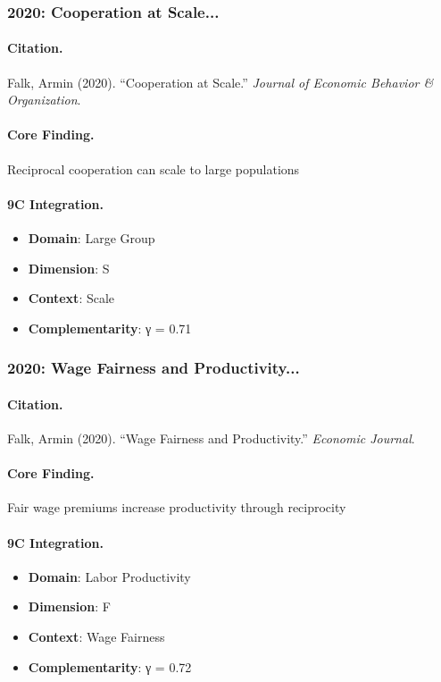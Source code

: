 \subsubsection{2020: Cooperation at Scale...}

\paragraph{Citation.}
Falk, Armin (2020). ``Cooperation at Scale.''
\textit{Journal of Economic Behavior & Organization}.

\paragraph{Core Finding.}
Reciprocal cooperation can scale to large populations

\paragraph{9C Integration.}
\begin{itemize}[nosep]
  \item \textbf{Domain}: Large Group
  \item \textbf{Dimension}: S
  \item \textbf{Context}: Scale
  \item \textbf{Complementarity}: γ = 0.71
\end{itemize}


\subsubsection{2020: Wage Fairness and Productivity...}

\paragraph{Citation.}
Falk, Armin (2020). ``Wage Fairness and Productivity.''
\textit{Economic Journal}.

\paragraph{Core Finding.}
Fair wage premiums increase productivity through reciprocity

\paragraph{9C Integration.}
\begin{itemize}[nosep]
  \item \textbf{Domain}: Labor Productivity
  \item \textbf{Dimension}: F
  \item \textbf{Context}: Wage Fairness
  \item \textbf{Complementarity}: γ = 0.72
\end{itemize}


